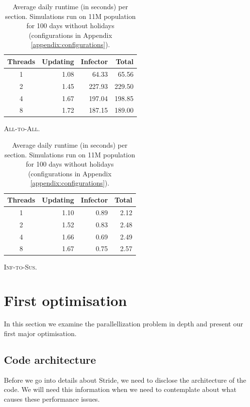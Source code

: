 \begin{table}
    \begin{subtable}[h]{0.45\textwidth}
        \centering
        \begin{tabular}{@{}crrr@{}}
            \toprule
            Threads & Updating & Infector & Total  \\ \midrule
            1       & 1.08     & 64.33    & 65.56  \\
            2       & 1.45     & 227.93   & 229.50 \\
            4       & 1.67     & 197.04   & 198.85 \\
            8       & 1.72     & 187.15   & 189.00 \\ \bottomrule
        \end{tabular}
        \caption{\textsc{All-to-All}.}
        \label{tab:basis_all_parallel}
    \end{subtable}
    \hfill
    \begin{subtable}[h]{0.45\textwidth}
        \centering
        \begin{tabular}{@{}crrr@{}}
            \toprule
            Threads & Updating & Infector & Total \\ \midrule
            1       & 1.10     & 0.89     & 2.12  \\
            2       & 1.52     & 0.83     & 2.48  \\
            4       & 1.66     & 0.69     & 2.49  \\
            8       & 1.67     & 0.75     & 2.57  \\ \bottomrule
        \end{tabular}
        \caption{\textsc{Inf-to-Sus}.}
        \label{tab:basis_opt_parallel}
    \end{subtable}
    \caption{Average daily runtime (in seconds) per section. Simulations run on 11M population for 100 days without holidays (configurations in Appendix \ref{appendix:configurations}).}
    \label{tab:basis_parallel}
\end{table}

\section{First optimisation}
\label{sec:first_optimisation}
In this section we examine the parallellization problem in depth and present our first major optimisation.

\subsection{Code architecture}
Before we go into details about Stride, we need to disclose the architecture of the code. We will need this information when we need to contemplate about what causes these performance issues.

